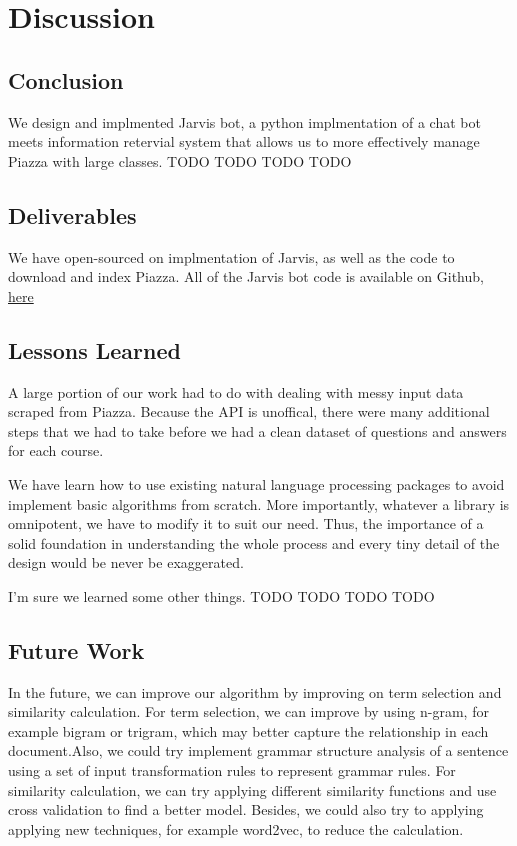 \documentclass[sigconf]{acmart}
\begin{document}
\section{Discussion}

\subsection{Conclusion}
We design and implmented Jarvis bot, a python implmentation of a chat bot meets information retervial system that allows us to more effectively manage Piazza with large classes.
TODO TODO TODO TODO

\subsection{Deliverables}
We have open-sourced on implmentation of Jarvis, as well as the code to download and index Piazza. All of the Jarvis bot code is available on Github, \href{https://github.com/pranavr93/piazza_bot}{here}

\subsection{Lessons Learned}
A large portion of our work had to do with dealing with messy input data scraped from Piazza. Because the API is unoffical, there were many additional steps that we had to take before we had a clean dataset of questions and answers for each course. 

We have learn how to use existing natural language processing packages to avoid implement basic algorithms from scratch. More importantly, whatever a library is omnipotent, we have to modify it to suit our need. Thus, the importance of a solid foundation in understanding the whole process and every tiny detail of the design would be never be exaggerated. 

I'm sure we learned some other things. 
TODO TODO TODO TODO

\subsection{Future Work}
In the future, we can improve our algorithm by improving on term selection and similarity calculation. For term selection, we can improve by using n-gram, for example bigram or trigram, which may better capture the relationship in each document.Also, we could try implement  grammar structure analysis of a sentence using a set of input transformation rules to represent grammar rules. For similarity calculation, we can try applying different similarity functions and use cross validation to find a better model. Besides, we could also try to applying applying new techniques, for example word2vec, to reduce the calculation.
\end{document}
